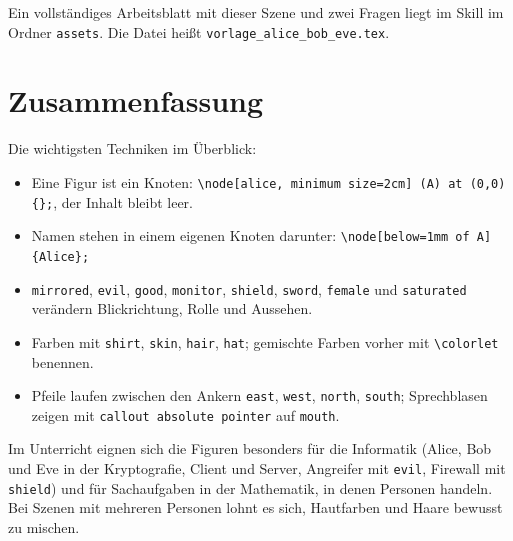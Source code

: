 Ein vollständiges Arbeitsblatt mit dieser Szene und zwei Fragen liegt im Skill im Ordner \texttt{assets}. Die Datei heißt \texttt{vorlage\_alice\_bob\_eve.tex}.



\section{Zusammenfassung}

Die wichtigsten Techniken im Überblick:

\begin{itemize}
	\item Eine Figur ist ein Knoten: \texttt{\textbackslash node[alice, minimum size=2cm] (A) at (0,0) \{\};}, der Inhalt bleibt leer.
	\item Namen stehen in einem eigenen Knoten darunter: \texttt{\textbackslash node[below=1mm of A] \{Alice\};}
	\item \texttt{mirrored}, \texttt{evil}, \texttt{good}, \texttt{monitor}, \texttt{shield}, \texttt{sword}, \texttt{female} und \texttt{saturated} verändern Blickrichtung, Rolle und Aussehen.
	\item Farben mit \texttt{shirt}, \texttt{skin}, \texttt{hair}, \texttt{hat}; gemischte Farben vorher mit \texttt{\textbackslash colorlet} benennen.
	\item Pfeile laufen zwischen den Ankern \texttt{east}, \texttt{west}, \texttt{north}, \texttt{south}; Sprechblasen zeigen mit \texttt{callout absolute pointer} auf \texttt{mouth}.
\end{itemize}

Im Unterricht eignen sich die Figuren besonders für die Informatik (Alice, Bob und Eve in der Kryptografie, Client und Server, Angreifer mit \texttt{evil}, Firewall mit \texttt{shield}) und für Sachaufgaben in der Mathematik, in denen Personen handeln. Bei Szenen mit mehreren Personen lohnt es sich, Hautfarben und Haare bewusst zu mischen.


